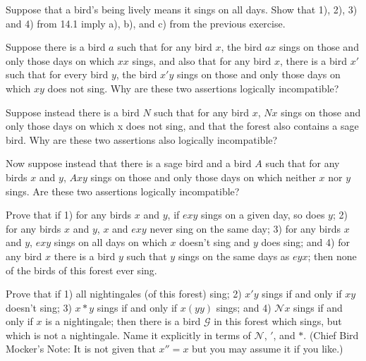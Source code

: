 \documentclass[12pt, letterpaper]{article}
\begin{document}
\begin{prob}
Suppose that a bird's being lively means it sings on all days. Show that 1), 2), 3) and 4) from 14.1 imply a), b), and c) from the previous exercise.
\end{prob}

\begin{prob}{15.1} 
Suppose there is a bird $a$ such that for any bird $x$, the bird $ax$ sings on those and only those days on which $xx$ sings, and also that for any bird $x$, there is a bird $x'$ such that for every bird $y$, the bird $x'y$ sings on those and only those days on which $xy$ does not sing. Why are these two assertions logically incompatible?
\end{prob}

\begin{prob}{15.2} 
Suppose instead there is a bird $N$ such that for any bird $x$, $Nx$ sings on those and only those days on which x does not sing, and that the forest also contains a sage bird. Why are these two assertions also logically incompatible?
\end{prob}

\begin{prob}{15.3} 
Now suppose instead that there is a sage bird and a bird $A$ such that for any birds $x$ and $y$, $Axy$ sings on those and only those days on which neither $x$ nor $y$ sings. Are these two assertions logically incompatible?
\end{prob}

\begin{prob}{16.1} 
Prove that if 1) for any birds $x$ and $y$, if $exy$ sings on a given day, so does $y$; 2) for any birds $x$ and $y$, $x$ and $exy$ never sing on the same day; 3) for any birds $x$ and $y$, $exy$ sings on all days on which $x$ doesn't sing and $y$ does sing; and 4) for any bird $x$ there is a bird $y$ such that $y$ sings on the same days as $eyx$; then none of the birds of this forest ever sing.
\end{prob}

\begin{prob}{17.1} 
Prove that if 1) all nightingales (of this forest) sing; 2) $x'y$ sings if and only if $xy$ doesn't sing; 3) $x*y$ sings if and only if $x(yy)$ sings; and 4) $\mathcal{N}x$ sings if and only if $x$ is a nightingale; then there is a bird $\mathcal{G}$ in this forest which sings, but which is not a nightingale. Name it explicitly in terms of $\mathcal{N}$, $'$, and $*$. (Chief Bird Mocker's Note: It is not given that $x'' = x$ but you may assume it if you like.)
\end{prob}
\end{document}
